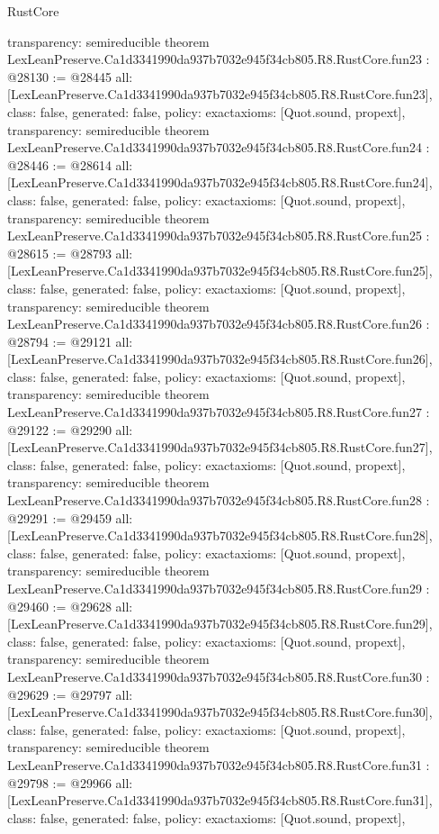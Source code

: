 \begin{lexlean}{RustCore}
\begin{coremodule}
{  transparency: semireducible
}
theorem LexLeanPreserve.Ca1d3341990da937b7032e945f34cb805.R8.RustCore.fun23 : @28130 := @28445 {
  all: [LexLeanPreserve.Ca1d3341990da937b7032e945f34cb805.R8.RustCore.fun23],
  class: false,
  generated: false,
  policy: exact{axioms: [Quot.sound, propext]},
  transparency: semireducible
}
theorem LexLeanPreserve.Ca1d3341990da937b7032e945f34cb805.R8.RustCore.fun24 : @28446 := @28614 {
  all: [LexLeanPreserve.Ca1d3341990da937b7032e945f34cb805.R8.RustCore.fun24],
  class: false,
  generated: false,
  policy: exact{axioms: [Quot.sound, propext]},
  transparency: semireducible
}
theorem LexLeanPreserve.Ca1d3341990da937b7032e945f34cb805.R8.RustCore.fun25 : @28615 := @28793 {
  all: [LexLeanPreserve.Ca1d3341990da937b7032e945f34cb805.R8.RustCore.fun25],
  class: false,
  generated: false,
  policy: exact{axioms: [Quot.sound, propext]},
  transparency: semireducible
}
theorem LexLeanPreserve.Ca1d3341990da937b7032e945f34cb805.R8.RustCore.fun26 : @28794 := @29121 {
  all: [LexLeanPreserve.Ca1d3341990da937b7032e945f34cb805.R8.RustCore.fun26],
  class: false,
  generated: false,
  policy: exact{axioms: [Quot.sound, propext]},
  transparency: semireducible
}
theorem LexLeanPreserve.Ca1d3341990da937b7032e945f34cb805.R8.RustCore.fun27 : @29122 := @29290 {
  all: [LexLeanPreserve.Ca1d3341990da937b7032e945f34cb805.R8.RustCore.fun27],
  class: false,
  generated: false,
  policy: exact{axioms: [Quot.sound, propext]},
  transparency: semireducible
}
theorem LexLeanPreserve.Ca1d3341990da937b7032e945f34cb805.R8.RustCore.fun28 : @29291 := @29459 {
  all: [LexLeanPreserve.Ca1d3341990da937b7032e945f34cb805.R8.RustCore.fun28],
  class: false,
  generated: false,
  policy: exact{axioms: [Quot.sound, propext]},
  transparency: semireducible
}
theorem LexLeanPreserve.Ca1d3341990da937b7032e945f34cb805.R8.RustCore.fun29 : @29460 := @29628 {
  all: [LexLeanPreserve.Ca1d3341990da937b7032e945f34cb805.R8.RustCore.fun29],
  class: false,
  generated: false,
  policy: exact{axioms: [Quot.sound, propext]},
  transparency: semireducible
}
theorem LexLeanPreserve.Ca1d3341990da937b7032e945f34cb805.R8.RustCore.fun30 : @29629 := @29797 {
  all: [LexLeanPreserve.Ca1d3341990da937b7032e945f34cb805.R8.RustCore.fun30],
  class: false,
  generated: false,
  policy: exact{axioms: [Quot.sound, propext]},
  transparency: semireducible
}
theorem LexLeanPreserve.Ca1d3341990da937b7032e945f34cb805.R8.RustCore.fun31 : @29798 := @29966 {
  all: [LexLeanPreserve.Ca1d3341990da937b7032e945f34cb805.R8.RustCore.fun31],
  class: false,
  generated: false,
  policy: exact{axioms: [Quot.sound, propext]},
}
\end{coremodule}
\end{lexlean}
